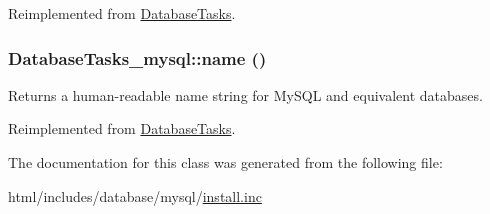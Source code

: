 Reimplemented from \hyperlink{classDatabaseTasks_a840dd551944911605ee2e139a434efea}{DatabaseTasks}.\hypertarget{classDatabaseTasks__mysql_ab8f790cc6df5bbde06325da137da7030}{
\subsubsection[{name}]{\setlength{\rightskip}{0pt plus 5cm}DatabaseTasks\_\-mysql::name ()}}
\label{classDatabaseTasks__mysql_ab8f790cc6df5bbde06325da137da7030}
Returns a human-\/readable name string for MySQL and equivalent databases. 

Reimplemented from \hyperlink{classDatabaseTasks_ae582e57b43461aad87f47ad0d37b6c9a}{DatabaseTasks}.

The documentation for this class was generated from the following file:\begin{DoxyCompactItemize}
\item 
html/includes/database/mysql/\hyperlink{database_2mysql_2install_8inc}{install.inc}\end{DoxyCompactItemize}
